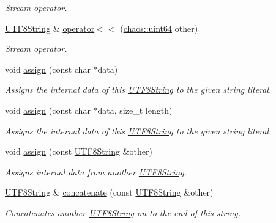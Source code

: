 \begin{DoxyCompactItemize}
\begin{DoxyCompactList}\small\item\em Stream operator. \end{DoxyCompactList}\item 
\hyperlink{classchaos_1_1str_1_1_u_t_f8_string}{U\+T\+F8\+String} \& \hyperlink{classchaos_1_1str_1_1_u_t_f8_string_a0f069c833c4fad2e87f9e4fb1138eca6}{operator$<$$<$} (\hyperlink{namespacechaos_a34fe5f5bfc3ef6d80b5d094ed91b4d6e}{chaos\+::uint64} other)
\begin{DoxyCompactList}\small\item\em Stream operator. \end{DoxyCompactList}\item 
void \hyperlink{classchaos_1_1str_1_1_u_t_f8_string_a483e71ec1090e346c63bf2b13b37ad7a}{assign} (const char $\ast$data)
\begin{DoxyCompactList}\small\item\em Assigns the internal data of this \hyperlink{classchaos_1_1str_1_1_u_t_f8_string}{U\+T\+F8\+String} to the given string literal. \end{DoxyCompactList}\item 
void \hyperlink{classchaos_1_1str_1_1_u_t_f8_string_a631f935a5b85214a2fa662a78f5693aa}{assign} (const char $\ast$data, size\+\_\+t length)
\begin{DoxyCompactList}\small\item\em Assigns the internal data of this \hyperlink{classchaos_1_1str_1_1_u_t_f8_string}{U\+T\+F8\+String} to the given string literal. \end{DoxyCompactList}\item 
void \hyperlink{classchaos_1_1str_1_1_u_t_f8_string_aff351b1a6276e5e59717bc6c3b67818c}{assign} (const \hyperlink{classchaos_1_1str_1_1_u_t_f8_string}{U\+T\+F8\+String} \&other)
\begin{DoxyCompactList}\small\item\em Assigns internal data from another \hyperlink{classchaos_1_1str_1_1_u_t_f8_string}{U\+T\+F8\+String}. \end{DoxyCompactList}\item 
\hyperlink{classchaos_1_1str_1_1_u_t_f8_string}{U\+T\+F8\+String} \& \hyperlink{classchaos_1_1str_1_1_u_t_f8_string_a8b61a2f73dacd4749d993dad00788d0d}{concatenate} (const \hyperlink{classchaos_1_1str_1_1_u_t_f8_string}{U\+T\+F8\+String} \&other)
\begin{DoxyCompactList}\small\item\em Concatenates another \hyperlink{classchaos_1_1str_1_1_u_t_f8_string}{U\+T\+F8\+String} on to the end of this string. \end{DoxyCompactList}\item 

\end{DoxyCompactItemize}
